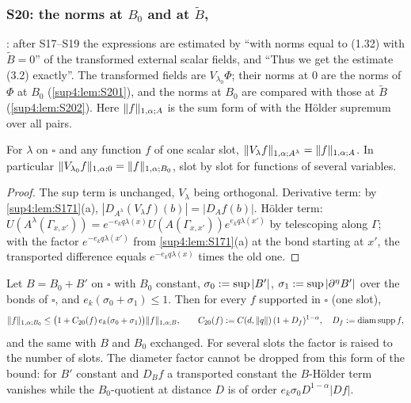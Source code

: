 
\subsubsection{S20: the norms \cite[(1.32)]{Ba3} at $B_0$ and at $\tilde B$, \cite[p.~434]{Ba3}}\label{sup4:ssec:S20}

\cite[p.~434]{Ba3}: after S17--S19 the expressions are estimated by \cite[(3.3)]{Ba3} ``with norms equal to (1.32) with $\tilde B=0$'' of the transformed external scalar fields, and ``Thus we get the estimate (3.2) exactly''. The transformed fields are $V_{\lambda_0}\Phi$; their norms at $0$ are the norms of $\Phi$ at $B_0$ (\cref{sup4:lem:S201}), and the norms at $B_0$ are compared with those at $\tilde B$ (\cref{sup4:lem:S202}). Here $\lVert f\rVert_{1,\alpha;A}$ is the sum form of \cite[(1.32)]{Ba3} with the H\"older supremum over all pairs.

\begin{lemma}\label{sup4:lem:S201}
For $\lambda$ on $\square$ and any function $f$ of one scalar slot, $\lVert V_\lambda f\rVert_{1,\alpha;A^\lambda}=\lVert f\rVert_{1,\alpha;A}$. In particular $\lVert V_{\lambda_0}f\rVert_{1,\alpha;0}=\lVert f\rVert_{1,\alpha;B_0}$, slot by slot for functions of several variables.
\end{lemma}

\begin{proof}
The sup term is unchanged, $V_\lambda$ being orthogonal. Derivative term: by \cref{sup4:lem:S171}(a), $|D_{A^\lambda}(V_\lambda f)(b)|=|D_Af(b)|$. H\"older term: $U(A^\lambda(\Gamma_{x,x'}))=e^{-e_kq\lambda(x)}U(A(\Gamma_{x,x'}))e^{e_kq\lambda(x')}$ by telescoping along $\Gamma$; with the factor $e^{-e_kq\lambda(x')}$ from \cref{sup4:lem:S171}(a) at the bond starting at $x'$, the transported difference equals $e^{-e_kq\lambda(x)}$ times the old one.
\end{proof}

\begin{lemma}\label{sup4:lem:S202}
Let $B=B_0+B'$ on $\square$ with $B_0$ constant, $\sigma_0:=\sup|B'|$, $\sigma_1:=\sup|\partial^\eta B'|$ over the bonds of $\square$, and $e_k(\sigma_0+\sigma_1)\le1$. Then for every $f$ supported in $\square$ (one slot),
\[
\lVert f\rVert_{1,\alpha;B_0}\le\big(1+C_{20}(f)\,e_k(\sigma_0+\sigma_1)\big)\lVert f\rVert_{1,\alpha;B},\qquad C_{20}(f):= C(d,\lVert q\rVert)\,(1+D_f)^{1-\alpha},\quad D_f:=\operatorname{diam}\operatorname{supp} f,
\]
and the same with $B$ and $B_0$ exchanged. For several slots the factor is raised to the number of slots. The diameter factor cannot be dropped from this form of the bound: for $B'$ constant and $D_Bf$ a transported constant the $B$-H\"older term vanishes while the $B_0$-quotient at distance $D$ is of order $e_k\sigma_0D^{1-\alpha}|Df|$.
\end{lemma}

